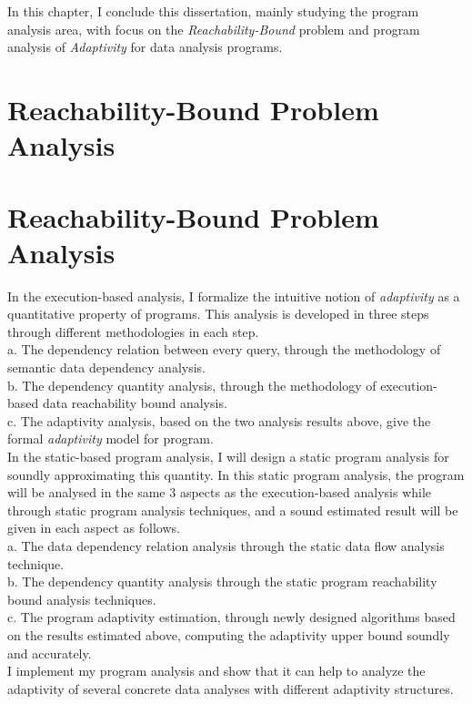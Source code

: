 In this chapter, I conclude this dissertation, mainly studying the program analysis area, 
with focus on the \emph{Reachability-Bound} problem
and program analysis of \emph{Adaptivity} for data analysis programs.

\section{Reachability-Bound Problem Analysis}
\label{sec:conclude-reachability}

\section{Reachability-Bound Problem Analysis}
\label{sec:conclude-adapt}
In the execution-based analysis, I formalize the intuitive notion of \emph{adaptivity} as a quantitative 
   property of programs. This analysis is developed in three steps through different methodologies in each step. 
   \\
	a. The dependency relation between every query, through the methodology of semantic data dependency analysis.
   \\
	b. The dependency quantity analysis, through the methodology of execution-based data reachability bound analysis.
   \\
	c. The adaptivity analysis, based on the two analysis results above, give the formal \emph{adaptivity} model 
   for program.
   \\   
	In the static-based program analysis, I will design a static program analysis for soundly approximating this quantity.
   In this static program analysis, the program will be analysed in the same 3 aspects as the execution-based analysis 
   while through static program analysis techniques, and a sound estimated result will be given in each aspect as follows.
   \\
	a. The data dependency relation analysis through the static data flow analysis technique.
   \\
	b. The dependency quantity analysis through the static program reachability bound analysis techniques.
   \\
	c. The program adaptivity estimation, through newly designed algorithms based on the results estimated above, 
   computing the adaptivity upper bound soundly 
   and accurately.
   \\
I implement my program analysis and show that it can help to analyze the adaptivity of several concrete data analyses with different adaptivity structures.

